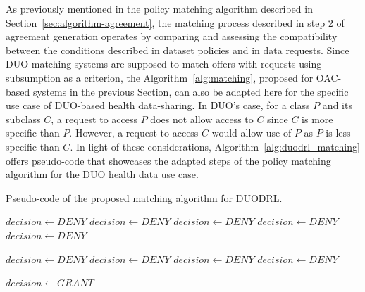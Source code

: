 As previously mentioned in the policy matching algorithm described in Section~\ref{sec:algorithm-agreement}, the matching process described in step 2 of agreement generation operates by comparing and assessing the compatibility between the conditions described in dataset policies and in data requests.
Since DUO matching systems are supposed to match offers with requests using subsumption as a criterion, the Algorithm~\ref{alg:matching}, proposed for OAC-based systems in the previous Section, can also be adapted here for the specific use case of DUO-based health data-sharing. 
In DUO's case, for a class $P$ and its subclass $C$, a request to access $P$ does not allow access to $C$ since $C$ is more specific than $P$.
However, a request to access $C$ would allow use of $P$ as $P$ is less specific than $C$.
In light of these considerations, Algorithm~\ref{alg:duodrl_matching} offers pseudo-code that showcases the adapted steps of the policy matching algorithm for the DUO health data use case.

\begin{algorithm}[ht]
\caption{Pseudo-code of the proposed matching algorithm for DUODRL.}
\label{alg:duodrl_matching}
\begin{algorithmic}
            $decision \gets DENY$
        \EndIf
    \EndIf
                $decision \gets DENY$
            \EndIf
                $decision \gets DENY$
            \EndIf
                $decision \gets DENY$
            \EndIf
            $decision \gets DENY$
        \EndIf
    \EndFor
\EndFor

            $decision \gets DENY$
        \EndIf
    \EndIf 
                $decision \gets DENY$
            \EndIf 
                $decision \gets DENY$
            \EndIf
            $decision \gets DENY$
        \EndIf 
    \EndFor 
\EndFor

    $decision \gets GRANT$
\EndIf
\end{algorithmic}
\end{algorithm}

